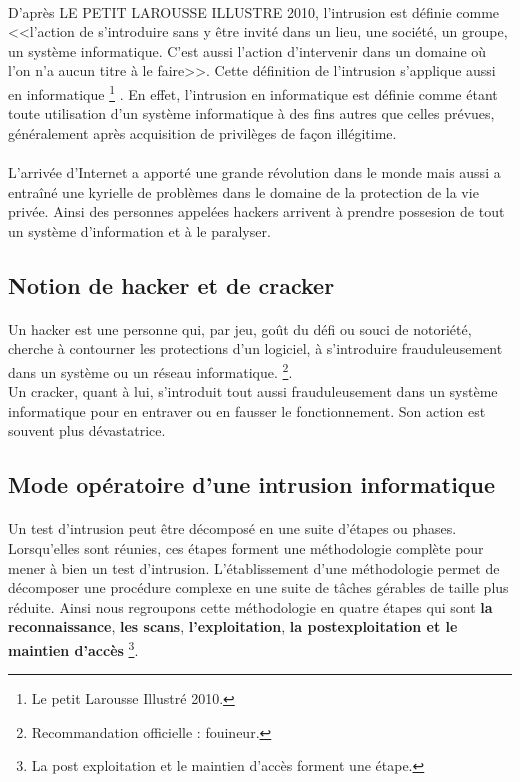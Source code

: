 \paragraph{}
  D’après LE PETIT LAROUSSE ILLUSTRE 2010, l’intrusion est définie comme <<l’action de s’introduire sans y être invité dans un lieu, une société, un groupe, un système informatique. C’est aussi l’action d’intervenir dans un domaine où l’on n'a aucun titre à le faire>>. Cette définition de l’intrusion s’applique aussi en informatique \footnote{ Le petit Larousse Illustré 2010.} \cite{b}. En effet, l’intrusion en informatique est définie comme étant toute utilisation d’un système informatique à des fins autres que celles prévues, généralement après acquisition de privilèges de façon illégitime.
\paragraph{}
  L'arrivée d'Internet a apporté une grande révolution dans le monde mais aussi a entraîné une kyrielle de problèmes dans le domaine de la protection de la vie privée.  Ainsi des personnes appelées hackers arrivent à prendre possesion de tout un système d'information et à le paralyser.

  
\subsection{Notion de hacker et de cracker}
  \paragraph{}
    Un hacker est une personne qui, par jeu, goût du défi ou souci de notoriété, cherche à contourner les protections d'un logiciel, à s'introduire frauduleusement dans un système ou un réseau informatique. \cite{A} \footnote{Recommandation officielle : fouineur.}.\\Un cracker, quant à lui, s’introduit tout aussi frauduleusement dans un système informatique pour en entraver ou en fausser le fonctionnement. Son action est souvent plus dévastatrice.
	

\subsection{Mode opératoire d'une intrusion informatique}
  \paragraph{}
    Un test d’intrusion peut être décomposé en une suite d’étapes ou phases. Lorsqu’elles sont réunies, ces étapes forment une méthodologie complète pour mener à bien un test d’intrusion. L’établissement d’une méthodologie permet de décomposer une procédure complexe en une suite de tâches gérables de taille plus réduite. Ainsi nous regroupons cette méthodologie en quatre étapes qui sont \textbf{la reconnaissance}, \textbf{les scans}, \textbf{l'exploitation}, \textbf{la postexploitation et le maintien d'accès} \footnote{La post exploitation et le maintien d'accès forment une étape.}\cite{c}.
      
